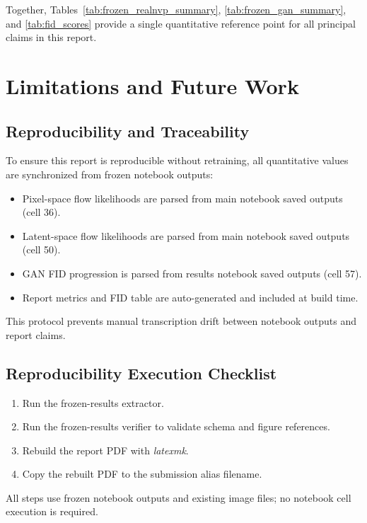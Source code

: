 \documentclass[conference,12pt]{IEEEtran}
\begin{document}
Together, Tables~\ref{tab:frozen_realnvp_summary}, \ref{tab:frozen_gan_summary}, and \ref{tab:fid_scores} provide a single quantitative reference point for all principal claims in this report.

\section{Limitations and Future Work}
\subsection{Reproducibility and Traceability}
To ensure this report is reproducible without retraining, all quantitative values are synchronized from frozen notebook outputs:
\begin{itemize}
    \item Pixel-space flow likelihoods are parsed from main notebook saved outputs (cell 36).
    \item Latent-space flow likelihoods are parsed from main notebook saved outputs (cell 50).
    \item GAN FID progression is parsed from results notebook saved outputs (cell 57).
    \item Report metrics and FID table are auto-generated and included at build time.
\end{itemize}
This protocol prevents manual transcription drift between notebook outputs and report claims.

\subsection{Reproducibility Execution Checklist}
\begin{enumerate}
    \item Run the frozen-results extractor.
    \item Run the frozen-results verifier to validate schema and figure references.
    \item Rebuild the report PDF with \textit{latexmk}.
    \item Copy the rebuilt PDF to the submission alias filename.
\end{enumerate}
All steps use frozen notebook outputs and existing image files; no notebook cell execution is required.
\end{document}
